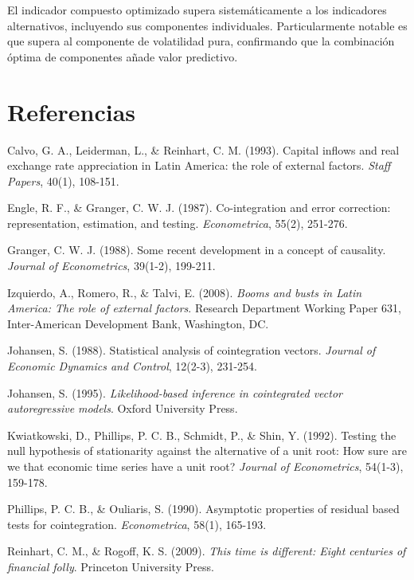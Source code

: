 \documentclass[3p,11pt]{elsarticle}
\begin{document}
El indicador compuesto optimizado supera sistemáticamente a los indicadores alternativos, incluyendo sus componentes individuales. Particularmente notable es que supera al componente de volatilidad pura, confirmando que la combinación óptima de componentes añade valor predictivo.

\section*{Referencias}

\begin{thebibliography}{99}

Calvo, G. A., Leiderman, L., \& Reinhart, C. M. (1993). Capital inflows and real exchange rate appreciation in Latin America: the role of external factors. \textit{Staff Papers}, 40(1), 108-151.

Engle, R. F., \& Granger, C. W. J. (1987). Co-integration and error correction: representation, estimation, and testing. \textit{Econometrica}, 55(2), 251-276.

Granger, C. W. J. (1988). Some recent development in a concept of causality. \textit{Journal of Econometrics}, 39(1-2), 199-211.

Izquierdo, A., Romero, R., \& Talvi, E. (2008). \textit{Booms and busts in Latin America: The role of external factors}. Research Department Working Paper 631, Inter-American Development Bank, Washington, DC.

Johansen, S. (1988). Statistical analysis of cointegration vectors. \textit{Journal of Economic Dynamics and Control}, 12(2-3), 231-254.

Johansen, S. (1995). \textit{Likelihood-based inference in cointegrated vector autoregressive models}. Oxford University Press.

Kwiatkowski, D., Phillips, P. C. B., Schmidt, P., \& Shin, Y. (1992). Testing the null hypothesis of stationarity against the alternative of a unit root: How sure are we that economic time series have a unit root? \textit{Journal of Econometrics}, 54(1-3), 159-178.

Phillips, P. C. B., \& Ouliaris, S. (1990). Asymptotic properties of residual based tests for cointegration. \textit{Econometrica}, 58(1), 165-193.

Reinhart, C. M., \& Rogoff, K. S. (2009). \textit{This time is different: Eight centuries of financial folly}. Princeton University Press.


\end{thebibliography}
\end{document}
